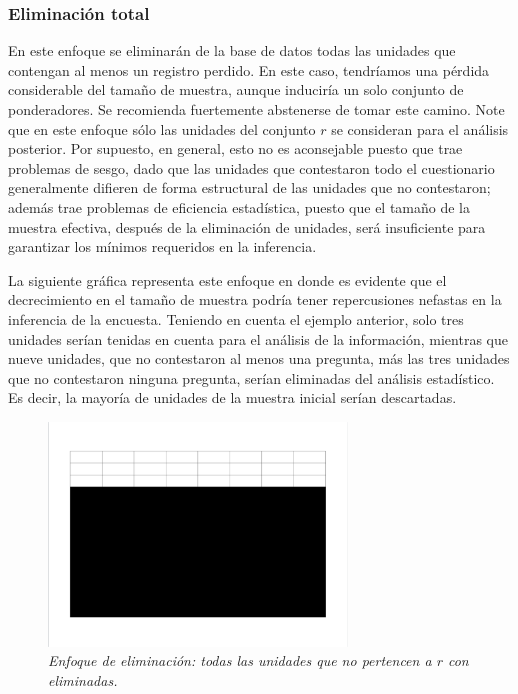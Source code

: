 \documentclass[
  10pt,
  spanish,
]{book}
\begin{document}
\hypertarget{eliminaciuxf3n-total}{%
\subsubsection*{Eliminación total}\label{eliminaciuxf3n-total}}

En este enfoque se eliminarán de la base de datos todas las unidades que contengan al menos un registro perdido. En este caso, tendríamos una pérdida considerable del tamaño de muestra, aunque induciría un solo conjunto de ponderadores. Se recomienda fuertemente abstenerse de tomar este camino. Note que en este enfoque sólo las unidades del conjunto \(r\) se consideran para el análisis posterior. Por supuesto, en general, esto no es aconsejable puesto que trae problemas de sesgo, dado que las unidades que contestaron todo el cuestionario generalmente difieren de forma estructural de las unidades que no contestaron; además trae problemas de eficiencia estadística, puesto que el tamaño de la muestra efectiva, después de la eliminación de unidades, será insuficiente para garantizar los mínimos requeridos en la inferencia.

La siguiente gráfica representa este enfoque en donde es evidente que el decrecimiento en el tamaño de muestra podría tener repercusiones nefastas en la inferencia de la encuesta. Teniendo en cuenta el ejemplo anterior, solo tres unidades serían tenidas en cuenta para el análisis de la información, mientras que nueve unidades, que no contestaron al menos una pregunta, más las tres unidades que no contestaron ninguna pregunta, serían eliminadas del análisis estadístico. Es decir, la mayoría de unidades de la muestra inicial serían descartadas.

\begin{figure}
\centering
\includegraphics[width=3.125in,height=\textheight]{Pics/j2.png}
\caption{\emph{Enfoque de eliminación: todas las unidades que no pertencen a \(r\) con eliminadas.}}
\end{figure}
\end{document}

